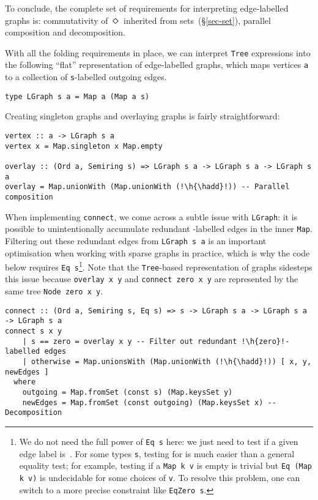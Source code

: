 \documentclass[crc,english]{programming}
\newcommand{\hcode}[1]{{\color{darkblue} \lstinline[keywordstyle={}]|#1|}} %
\newcommand{\hfcode}[1]{{\color{darkblue} \lstinline[keywordstyle={},basicstyle=\footnotesize\ttfamily]|#1|}} %
\newcommand{\h}[1]{{\itshape\color{grayblue}#1}} %
\newcommand{\hadd}{{\large\color{darkblue} $\oplus$}}
\newcommand{\zero}{\raisebox{-0.2mm}{\textcircled{\textsf{0}}}\xspace}
\newcommand{\dia}{\,\text{\raisebox{-0.3mm}{\Large $\diamond$}}\,}
\begin{document}
\noindent
To conclude, the complete set of requirements for interpreting edge-labelled
graphs is: commutativity of $\dia$ inherited from sets~(\S\ref{sec-set}),
parallel composition and decomposition.

\newpage
\noindent
With all the folding requirements in place, we can interpret \hcode{Tree}
expressions into the following ``flat'' representation of edge-labelled graphs,
which maps vertices \hcode{a} to a collection of \hcode{s}-labelled outgoing
edges.


\begin{lstlisting}
type LGraph s a = Map a (Map a s)
\end{lstlisting}

\noindent
Creating singleton graphs and overlaying graphs is fairly straightforward:

\begin{lstlisting}
vertex :: a -> LGraph s a
vertex x = Map.singleton x Map.empty

overlay :: (Ord a, Semiring s) => LGraph s a -> LGraph s a -> LGraph s a
overlay = Map.unionWith (Map.unionWith (!\h{\hadd}!)) -- Parallel composition
\end{lstlisting}

\noindent
When implementing \hcode{connect}, we come across a subtle issue with
\hcode{LGraph}: it is possible to unintentionally accumulate redundant
\zero-labelled edges in the inner \hcode{Map}. Filtering out these redundant
edges from \hcode{LGraph s a} is an important optimisation when working
with sparse graphs in practice, which is why the code below requires
\hcode{Eq s}\footnote{
    We do not need the full power of \hfcode{Eq s} here: we just need to test if
    a given edge label is~\zero. For some types \hfcode{s}, testing for \zero is
    much easier than a general equality test; for example, testing if a
    \hfcode{Map k v} is empty is trivial but \hfcode{Eq (Map k v)} is undecidable
    for some choices of \hfcode{v}. To resolve this problem, one can switch to a
    more precise constraint like \hfcode{EqZero s}.
}. Note that the \hcode{Tree}-based representation of graphs sidesteps this
issue because \hcode{overlay x y} and \hcode{connect zero x y} are represented
by the same tree \hcode{Node zero x y}.

\begin{lstlisting}
connect :: (Ord a, Semiring s, Eq s) => s -> LGraph s a -> LGraph s a -> LGraph s a
connect s x y
    | s == zero = overlay x y -- Filter out redundant !\h{zero}!-labelled edges
    | otherwise = Map.unionsWith (Map.unionWith (!\h{\hadd}!)) [ x, y, newEdges ]
  where
    outgoing = Map.fromSet (const s) (Map.keysSet y)
    newEdges = Map.fromSet (const outgoing) (Map.keysSet x) -- Decomposition
\end{lstlisting}
\end{document}
